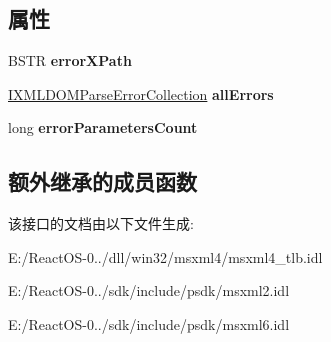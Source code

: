 \subsection*{属性}
\begin{DoxyCompactItemize}
\item 
\mbox{\label{interface_m_s_x_m_l2_1_1_i_x_m_l_d_o_m_parse_error2_aa69403f16cb27278fa78392f446fece0}} 
B\+S\+TR {\bfseries error\+X\+Path}
\item 
\mbox{\label{interface_m_s_x_m_l2_1_1_i_x_m_l_d_o_m_parse_error2_a2cefb400b70aa36b3ff012b54b531608}} 
\hyperlink{interface_m_s_x_m_l2_1_1_i_x_m_l_d_o_m_parse_error_collection}{I\+X\+M\+L\+D\+O\+M\+Parse\+Error\+Collection} {\bfseries all\+Errors}
\item 
\mbox{\label{interface_m_s_x_m_l2_1_1_i_x_m_l_d_o_m_parse_error2_af98f57a497c89768f8c3a0ac9a76be72}} 
long {\bfseries error\+Parameters\+Count}
\end{DoxyCompactItemize}
\subsection*{额外继承的成员函数}


该接口的文档由以下文件生成\+:\begin{DoxyCompactItemize}
\item 
E\+:/\+React\+O\+S-\/0../dll/win32/msxml4/msxml4\+\_\+tlb.\+idl\item 
E\+:/\+React\+O\+S-\/0../sdk/include/psdk/msxml2.\+idl\item 
E\+:/\+React\+O\+S-\/0../sdk/include/psdk/msxml6.\+idl\end{DoxyCompactItemize}
